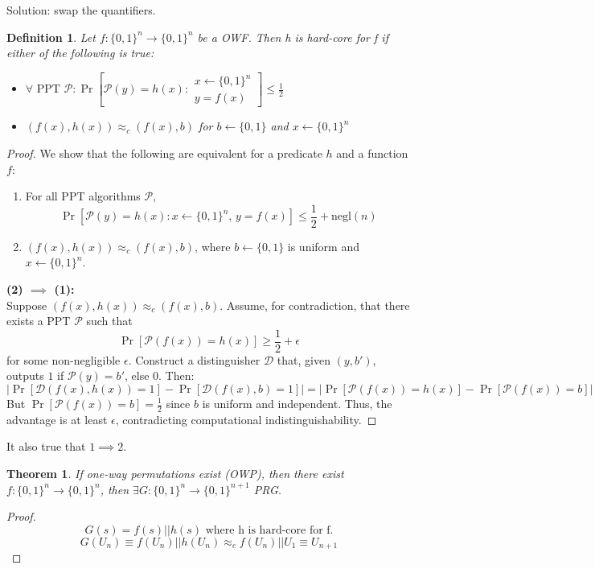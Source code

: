\documentclass[11pt, a4paper]{article}
\newtheorem{thm}{Theorem}
\newtheorem{defn}{Definition}
\begin{document}
Solution: swap the quantifiers.
\begin{defn}
    Let $f : \{0,1\}^n \rightarrow \{0,1\}^n$ be a OWF. Then h is hard-core for f if either of the following is true:
    \begin{itemize}
        \item $\forall \text{ PPT } \mathcal{P}\colon \Pr[\mathcal{P}(y) = h(x): \substack{x \leftarrow \{0,1\}^n \\ y = f(x)}] \leq \frac{1}{2}$
        \item $(f(x),h(x)) \approx_c (f(x),b)$ for $b \leftarrow \{0,1\}$ and $x \leftarrow \{0,1\}^n$
    \end{itemize}
\end{defn}
\begin{proof}
We show that the following are equivalent for a predicate $h$ and a function $f$:
\begin{enumerate}
    \item For all PPT algorithms $\mathcal{P}$,
    \[
        \Pr\left[\mathcal{P}(y) = h(x) : x \leftarrow \{0,1\}^n,\, y = f(x)\right] \leq \frac{1}{2} + \text{negl}(n)
    \]
    \item $(f(x), h(x)) \approx_c (f(x), b)$, where $b \leftarrow \{0,1\}$ is uniform and $x \leftarrow \{0,1\}^n$.
\end{enumerate}

\textbf{(2) $\implies$ (1):} \\
Suppose $(f(x), h(x)) \approx_c (f(x), b)$. Assume, for contradiction, that there exists a PPT $\mathcal{P}$ such that
\[
    \Pr[\mathcal{P}(f(x)) = h(x)] \geq \frac{1}{2} + \epsilon
\]
for some non-negligible $\epsilon$. Construct a distinguisher $\mathcal{D}$ that, given $(y, b')$, outputs $1$ if $\mathcal{P}(y) = b'$, else $0$. Then:
\[
    \left| \Pr[\mathcal{D}(f(x), h(x)) = 1] - \Pr[\mathcal{D}(f(x), b) = 1] \right| = \left| \Pr[\mathcal{P}(f(x)) = h(x)] - \Pr[\mathcal{P}(f(x)) = b] \right|
\]
But $\Pr[\mathcal{P}(f(x)) = b] = \frac{1}{2}$ since $b$ is uniform and independent. Thus, the advantage is at least $\epsilon$, contradicting computational indistinguishability.

\end{proof}
It also true that $1 \implies 2$.\\
\begin{thm}
    If one-way permutations exist (OWP), then there exist $f\colon\{0,1\}^n \rightarrow \{0,1\}^n$, then $\exists G\colon\{0,1\}^n \rightarrow\{0,1\}^{n+1}$ PRG.
\end{thm}
\begin{proof}
    $$G(s) = f(s) || h(s) \text{ where h is hard-core for f.}$$
    $$G(U_n) \equiv f(U_n) || h(U_n) \approx_c f(U_n) || U_1 \equiv U_{n+1}$$
\end{proof}
\end{document}
